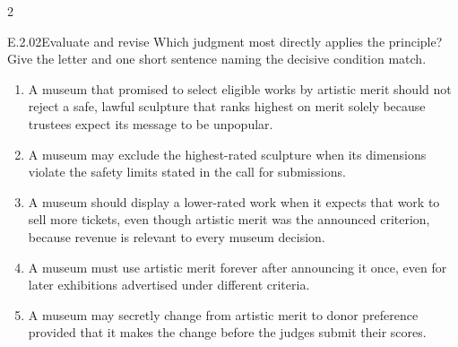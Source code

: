 \documentclass[9pt]{extarticle}
\newcommand{\choice}[1]{\item #1}
\begin{document}
\begin{multicols}{2}
\begin{DenseCoreProblem}{E.2.02}{Evaluate and revise}
Which judgment most directly applies the principle? Give the letter and one short sentence naming the decisive condition match.
\begin{enumerate}[label=(\alph*)]
  \choice{A museum that promised to select eligible works by artistic merit should not reject a safe, lawful sculpture that ranks highest on merit solely because trustees expect its message to be unpopular.}
  \choice{A museum may exclude the highest-rated sculpture when its dimensions violate the safety limits stated in the call for submissions.}
  \choice{A museum should display a lower-rated work when it expects that work to sell more tickets, even though artistic merit was the announced criterion, because revenue is relevant to every museum decision.}
  \choice{A museum must use artistic merit forever after announcing it once, even for later exhibitions advertised under different criteria.}
  \choice{A museum may secretly change from artistic merit to donor preference provided that it makes the change before the judges submit their scores.}
\end{enumerate}
\end{DenseCoreProblem}
\end{multicols}
\CoreWorkArea
\FormBreak
{}
\end{document}
